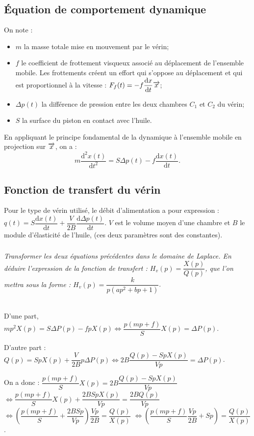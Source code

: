 \documentclass[10pt,fleqn]{article} %
\begin{document}
\begin{multicols}{2}
\subsection*{Équation de comportement dynamique}
On note : 
\begin{itemize}
\item $m$ la masse totale mise en mouvement par le vérin;
\item $f$ le coefficient de frottement visqueux associé au déplacement de l’ensemble mobile. Les frottements créent un effort qui s’oppose au déplacement et qui est proportionnel à la vitesse : $F_f(t)=-f\dfrac{\text{d} x}{\text{d} t} \overrightarrow{x}$;
\item $\Delta p(t)$ la différence de pression entre les deux chambres $C_1$ et $C_2$ du vérin;
\item $S$ la surface du piston en contact avec l’huile.
\end{itemize}
En appliquant le principe fondamental de la dynamique à l’ensemble mobile en projection sur $\overrightarrow{x}$, on a : 
$$m\dfrac{\text{d}^2 x(t) }{\text{d}t^2}=S\Delta p(t)-f\dfrac{\text{d} x(t) }{\text{d}t}.$$



\subsection*{Fonction de transfert du vérin}
Pour le type de vérin utilisé, le débit d'alimentation a pour expression : $q(t)=S\dfrac{\text{d}x(t)}{\text{d} t}+\dfrac{V}{2B}\dfrac{\text{d}\Delta p(t)}{\text{d}t}$. $V$ est le volume moyen d’une chambre et $B$ le module d’élasticité de l’huile, (ces deux paramètres sont des constantes).

\subparagraph{}\textit{Transformer les deux équations précédentes dans le domaine de Laplace. En déduire l’expression de la fonction de transfert : $H_v(p)=\dfrac{X(p)}{Q(p)}$, que l’on mettra sous la forme : $H_v(p)=\dfrac{k}{p\left( ap^2 + bp + 1\right)}$}.
\begin{corrige} ~\\
D'une part, $mp^2X(p)=S\Delta P(p)-fpX(p) \Leftrightarrow \dfrac{p\left(mp+f\right)}{S}X(p)=\Delta P(p) $.

D'autre part :
$Q(p)=SpX(p)+\dfrac{V}{2B}p\Delta P(p) \Leftrightarrow 2B\dfrac{Q(p)-SpX(p)}{Vp}=\Delta P(p) $.

On a donc : 
$\dfrac{p\left(mp+f\right)}{S}X(p) =
2B\dfrac{Q(p)-SpX(p)}{Vp}$
$\Longleftrightarrow
\dfrac{p\left(mp+f\right)}{S}X(p) +\dfrac{2BSpX(p)}{Vp}=
\dfrac{2BQ(p)}{Vp}$
$\Longleftrightarrow
\left(\dfrac{p\left(mp+f\right)}{S} +\dfrac{2BSp}{Vp}\right) \dfrac{Vp}{2B}=
\dfrac{Q(p)}{ X(p)}$
$\Longleftrightarrow
\left(\dfrac{p\left(mp+f\right)}{S} \dfrac{Vp}{2B}+Sp \right) =
\dfrac{Q(p)}{ X(p)}$.


\end{corrige}
\end{multicols}
\end{document}
